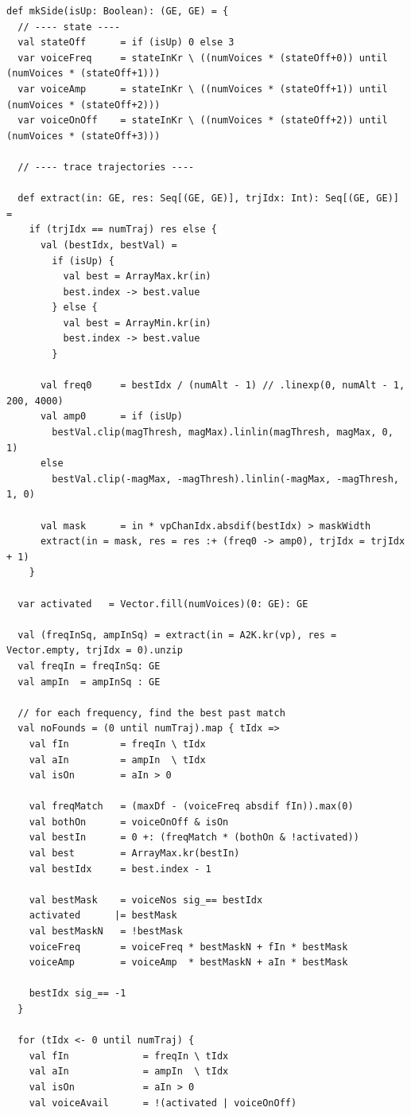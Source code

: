 \documentclass[11pt,a4paper]{article}
\begin{document}
\begin{lstlisting}[style=scala-small]
def mkSide(isUp: Boolean): (GE, GE) = {
  // ---- state ----
  val stateOff      = if (isUp) 0 else 3
  var voiceFreq     = stateInKr \ ((numVoices * (stateOff+0)) until (numVoices * (stateOff+1)))
  var voiceAmp      = stateInKr \ ((numVoices * (stateOff+1)) until (numVoices * (stateOff+2)))
  var voiceOnOff    = stateInKr \ ((numVoices * (stateOff+2)) until (numVoices * (stateOff+3)))
  
  // ---- trace trajectories ----
  
  def extract(in: GE, res: Seq[(GE, GE)], trjIdx: Int): Seq[(GE, GE)] = 
    if (trjIdx == numTraj) res else {
      val (bestIdx, bestVal) = 
        if (isUp) {
          val best = ArrayMax.kr(in)
          best.index -> best.value
        } else {
          val best = ArrayMin.kr(in)
          best.index -> best.value
        }

      val freq0     = bestIdx / (numAlt - 1) // .linexp(0, numAlt - 1, 200, 4000)
      val amp0      = if (isUp)
        bestVal.clip(magThresh, magMax).linlin(magThresh, magMax, 0, 1)
      else
        bestVal.clip(-magMax, -magThresh).linlin(-magMax, -magThresh, 1, 0)
      
      val mask      = in * vpChanIdx.absdif(bestIdx) > maskWidth
      extract(in = mask, res = res :+ (freq0 -> amp0), trjIdx = trjIdx + 1)
    }
  
  var activated   = Vector.fill(numVoices)(0: GE): GE
  
  val (freqInSq, ampInSq) = extract(in = A2K.kr(vp), res = Vector.empty, trjIdx = 0).unzip
  val freqIn = freqInSq: GE
  val ampIn  = ampInSq : GE
  
  // for each frequency, find the best past match
  val noFounds = (0 until numTraj).map { tIdx =>
    val fIn         = freqIn \ tIdx
    val aIn         = ampIn  \ tIdx
    val isOn        = aIn > 0
  
    val freqMatch   = (maxDf - (voiceFreq absdif fIn)).max(0)
    val bothOn      = voiceOnOff & isOn
    val bestIn      = 0 +: (freqMatch * (bothOn & !activated))
    val best        = ArrayMax.kr(bestIn)
    val bestIdx     = best.index - 1
  
    val bestMask    = voiceNos sig_== bestIdx
    activated      |= bestMask
    val bestMaskN   = !bestMask
    voiceFreq       = voiceFreq * bestMaskN + fIn * bestMask
    voiceAmp        = voiceAmp  * bestMaskN + aIn * bestMask
    
    bestIdx sig_== -1
  }
  
  for (tIdx <- 0 until numTraj) {
    val fIn             = freqIn \ tIdx
    val aIn             = ampIn  \ tIdx
    val isOn            = aIn > 0
    val voiceAvail      = !(activated | voiceOnOff)
  

\end{lstlisting}
\end{document}
